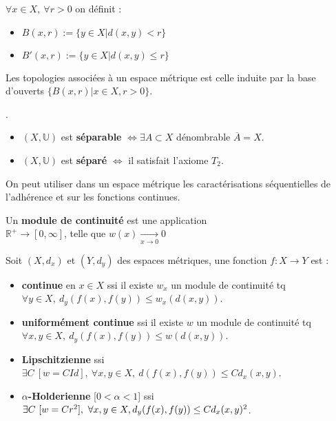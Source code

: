 \begin{definition}
    $\forall x\in X,\ \forall r>0$ on définit :
    \begin{itemize}
        \item $B(x,r):=\{y\in X|d(x,y)<r\} $
        \item $B'(x,r):=\{y\in X|d(x,y)\le r\} $
    \end{itemize}
\end{definition}

Les topologies associées à un espace métrique est celle induite par la base d'ouverts $\{B(x,r)|x\in X,r>0\} $.

\begin{definition}.
    \begin{itemize}
        \item $(X,\mathbb{U})$ est \textbf{séparable} $\Leftrightarrow \exists A\subset X $ dénombrable $\overline{A}=X$.
        \item $(X,\mathbb{U})$ est \textbf{séparé} $\Leftrightarrow $ il satisfait l'axiome $T_2$.
\end{itemize}
\end{definition}

On peut utiliser dans un espace métrique les caractérisations séquentielles de l'adhérence et sur les fonctions continues.

\begin{definition}
    Un \textbf{module de continuité} est une application\\$\mathbb{R} ^+\to [0,\infty ]$, telle que $w(x)\underset{x\to 0}{\longrightarrow} 0$
\end{definition}

Soit $(X,d_x)$ et $(Y,d_y)$ des espaces métriques, une fonction $f:X\to Y$ est :
\begin{itemize}
    \item \textbf{continue} en $x\in X$ ssi il existe $w_x$ un module de continuité tq \\$ \forall y\in X,\ d_y(f(x),f(y))\le w_x(d(x,y))$.
\item \textbf{uniformément continue} ssi il existe $w$ un module de continuité tq $\forall x,y\in X,\ d_y(f(x),f(y))\le w(d(x,y))$.
\item \textbf{Lipschitzienne} ssi $\exists C\ [w=CId],\ \forall x,y\in X,\ d(f(x),f(y))\le Cd_x(x,y)$.
\item \textbf{$ \alpha$-Holderienne} [$ 0<\alpha<1$]  ssi $\exists C\ [w=Cr^2],\ \forall x,y\in X,\\ d_y(f(x),f(y))\le Cd_x(x,y)^2$.
\end{itemize}

